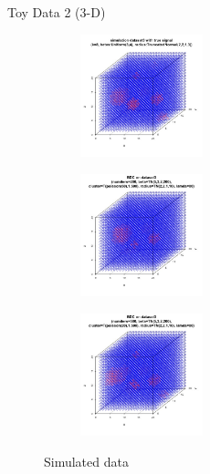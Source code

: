 \documentclass[10pt,mathserif]{beamer}
\begin{document}
\begin{frame}{Toy Data 2 (3-D)}
\begin{figure}[t!]
    \centering
    \begin{subfigure}[t]{0.3\textwidth}
        \centering
        \includegraphics[height=1.4in, width=1.4in]{../simulation_data3.jpg}
        \caption{}
    \end{subfigure}%
    \begin{subfigure}[t]{0.3\textwidth}
        \centering
        \includegraphics[height=1.4in, width=1.4in]{../datase3_poi50.jpg}
        \caption{}
    \end{subfigure}%
        \begin{subfigure}[t]{0.3\textwidth}
        \centering
        \includegraphics[height=1.4in, width=1.4in]{../best3.jpg}
        \caption{}
    \end{subfigure}
    \caption{Simulated data}
\end{figure}
\end{frame}
\end{document}
